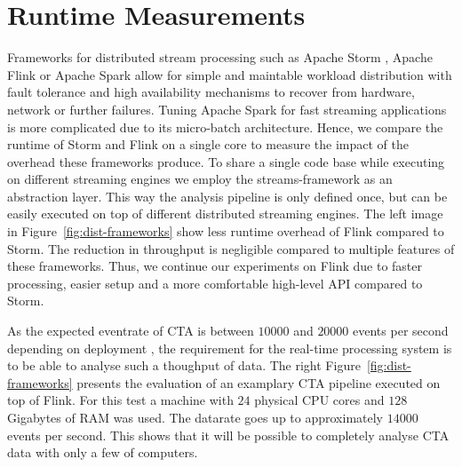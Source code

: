 \documentclass[11pt,twoside]{article}
\begin{document}
\section{Runtime Measurements}

Frameworks for distributed stream processing such as Apache Storm \citep{storm}, Apache Flink \citep{flink} or Apache Spark \citep{spark} allow for simple and maintable workload distribution with fault tolerance and high availability mechanisms to recover from hardware, network or further failures. 
Tuning Apache Spark for fast streaming applications is more complicated due to its micro-batch architecture. 
Hence, we compare the runtime of Storm and Flink on a single core to measure the impact of the overhead these frameworks produce. 
To share a single code base while executing on different streaming engines we employ the streams-framework \citep{streams} as an abstraction layer.
This way the analysis pipeline is only defined once, but can be easily executed on top of different distributed streaming engines. 
The left image in Figure~\ref{fig:dist-frameworks} show less runtime overhead of Flink compared to Storm. 
The reduction in throughput is negligible compared to multiple features of these frameworks.
Thus, we continue our experiments on Flink due to faster processing, easier setup and a more comfortable high-level API compared to Storm.

As the expected eventrate of CTA is between $10000$ and $20000$ events per second depending on deployment \citep{trigger}, the requirement for the real-time processing system is to be able to analyse such a thoughput of data. 
The right Figure~\ref{fig:dist-frameworks} presents the evaluation of an examplary CTA pipeline executed on top of Flink.
For this test a machine with $24$ physical CPU cores and $128$ Gigabytes of RAM was used.
The datarate goes up to approximately $14000$ events per second. 
This shows that it will be possible to completely analyse CTA data with only a few of computers.

\end{document}
